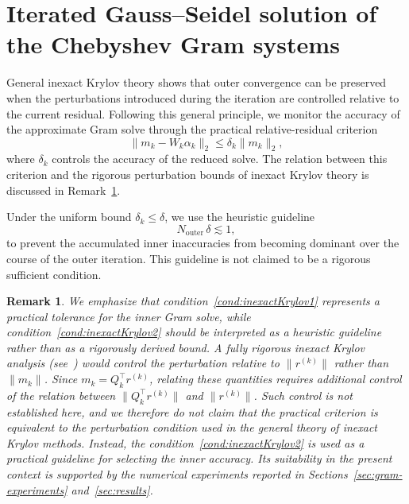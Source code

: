\documentclass[pdflatex,sn-mathphys-num]{sn-jnl}%
\newtheorem{remark}{Remark}
\begin{document}
\section{Iterated Gauss--Seidel solution of the Chebyshev Gram systems}
\label{sec:erroranalysis}

General inexact Krylov theory
\cite{vandenEshofSleijpen2004,bouras2005}
shows that outer convergence can be preserved when the perturbations
introduced during the iteration are controlled relative to the
current residual. Following this general principle, we monitor the
accuracy of the approximate Gram solve through the practical
relative-residual criterion
\begin{equation}
\|m_k-W_k\alpha_k\|_2
\leq
\delta_k\|m_k\|_2,
\label{cond:inexactKrylov1}
\end{equation}
where $\delta_k$ controls the accuracy of the reduced solve. The
relation between this criterion and the rigorous perturbation bounds
of inexact Krylov theory is discussed in
Remark~\ref{remark:inexactkrylov}.

Under the uniform bound $\delta_k\leq\delta$, we use the heuristic
guideline
\begin{equation}
N_{\mathrm{outer}}\,\delta\lesssim1,
\label{cond:inexactKrylov2}
\end{equation}
to prevent the accumulated inner inaccuracies from becoming
dominant over the course of the outer iteration. This guideline is
not claimed to be a rigorous sufficient condition.

\begin{remark}
\label{remark:inexactkrylov}
We emphasize that condition~\eqref{cond:inexactKrylov1} represents a practical tolerance for the inner Gram solve, while condition~\eqref{cond:inexactKrylov2} should be interpreted as a heuristic
guideline rather than as a rigorously derived bound. A fully rigorous inexact Krylov analysis
(see~\cite{vandenEshofSleijpen2004,bouras2005})
would control the perturbation relative to $\|r^{(k)}\|$ rather than
$\|m_k\|$. Since $m_k=Q_k^\top r^{(k)}$, relating these quantities requires
additional control of the relation between
$\|Q_k^\top r^{(k)}\|$ and $\|r^{(k)}\|$. Such control is not
established here, and we therefore do not claim that the practical
criterion is equivalent to the perturbation condition used in the
general theory of inexact Krylov methods. Instead, the condition~\eqref{cond:inexactKrylov2} is used as a
practical guideline for selecting the inner accuracy. Its suitability in
the present context is supported by the numerical experiments reported in
Sections~\ref{sec:gram-experiments} and~\ref{sec:results}.
\end{remark}
\end{document}
